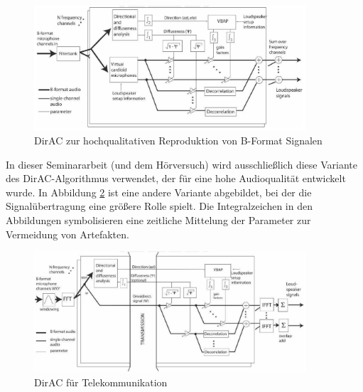 \begin{figure}[!ht]
  \centering
  \includegraphics[width=0.9\textwidth]{funktionsweise/pic/pulkki_dirac_flow_2.png}
  \caption{DirAC zur hochqualitativen Reproduktion von B-Format Signalen\protect\footnotemark}
  \label{fig:dirac_flow_high}
\end{figure}


In dieser Seminararbeit (und dem Hörversuch) wird ausschließlich diese Variante des DirAC-Algorithmus verwendet, der für eine hohe Audioqualität entwickelt wurde. In Abbildung \ref{fig:dirac_flow_low} ist eine andere Variante abgebildet, bei der die Signalübertragung eine größere Rolle spielt. Die Integralzeichen in den Abbildungen symbolisieren eine zeitliche Mittelung der Parameter zur Vermeidung von Artefakten.

\begin{figure}[!ht]
  \centering
  \includegraphics[width=0.9\textwidth]{funktionsweise/pic/pulkki_dirac_flow_3.png}
  \caption{DirAC für Telekommunikation\protect\footnotemark}
  \label{fig:dirac_flow_low}
\end{figure}

